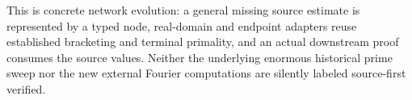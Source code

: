 \documentclass[11pt]{article}
\begin{document}
This is concrete network evolution: a general missing source estimate is represented by a typed node, real-domain and endpoint adapters reuse established bracketing and terminal primality, and an actual downstream proof consumes the source values. Neither the underlying enormous historical prime sweep nor the new external Fourier computations are silently labeled source-first verified.


\begin{center}


\ifdim\wd\eqbox>\linewidth\resizebox{\linewidth}{!}{\usebox{\eqbox}}\else\usebox{\eqbox}\fi

\end{center}

\begin{center}


\ifdim\wd\eqbox>\linewidth\resizebox{\linewidth}{!}{\usebox{\eqbox}}\else\usebox{\eqbox}\fi

\end{center}

\begin{center}

\sbox{\eqbox}{$\displaystyle \begin{gathered}P_{64}=18446744073709551557:\\\forall x\in[2,P_{64}),\ \exists p\in\mathbb P:\ x<p\le x+1550;\\\forall x\in[2,P_{64})\ \forall\varepsilon>0,\ \exists p\in\mathbb P:\ x<p<x+1550+\varepsilon.\end{gathered}$}

\ifdim\wd\eqbox>\linewidth\resizebox{\linewidth}{!}{\usebox{\eqbox}}\else\usebox{\eqbox}\fi

\end{center}

\begin{center}


\ifdim\wd\eqbox>\linewidth\resizebox{\linewidth}{!}{\usebox{\eqbox}}\else\usebox{\eqbox}\fi

\end{center}
\end{document}
